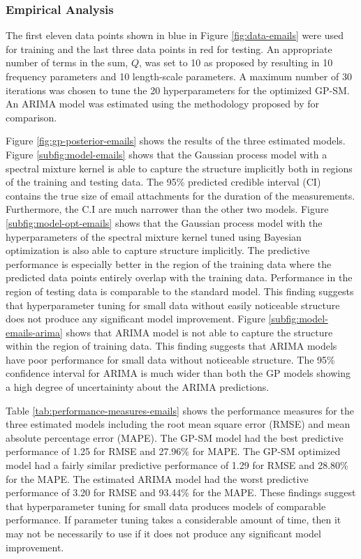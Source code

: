 \documentclass[letterpaper]{article}
\begin{document}
\subsubsection{Empirical Analysis}
The first eleven data points shown in blue in Figure \ref{fig:data-emails} were used for training and the last three data points in red for testing. An appropriate number of terms in the sum, $Q$, was set to 10 as proposed by \cite{wilson2015human} resulting in 10 frequency parameters and 10 length-scale parameters. A maximum number of 30 iterations was chosen to tune the 20 hyperparameters for the optimized GP-SM. An ARIMA model was estimated using the methodology proposed by \cite{veeramisti2016business} for comparison.

Figure \ref{fig:gp-posterior-emails} shows the results of the three estimated models. Figure \ref{subfig:model-emails} shows that the Gaussian process model with a spectral mixture kernel is able to capture the structure implicitly both in regions of the training and testing data. The 95\% predicted credible interval (CI) contains the true size of email attachments for the duration of the measurements. Furthermore, the C.I are much narrower than the other two models. Figure \ref{subfig:model-opt-emails} shows that the Gaussian process model with the hyperparameters of the spectral mixture kernel tuned using Bayesian optimization is also able to capture structure implicitly. The predictive performance is especially better in the region of the training data where the predicted data points entirely overlap with the training data. Performance in the region of testing data is comparable to the standard model. This finding suggests that hyperparameter tuning for small data without easily noticeable structure does not produce any significant model improvement. Figure \ref{subfig:model-emails-arima} shows that ARIMA model is not able to capture the structure within the region of training data. This finding suggests that ARIMA models have poor performance for small data without noticeable structure. The 95\% confidence interval for ARIMA is much wider than both the GP models showing a high degree of uncertaininty about the ARIMA predictions.

Table \ref{tab:performance-measures-emails} shows the performance measures for the three estimated models including the root mean square error (RMSE) and mean absolute percentage error (MAPE). The GP-SM model had the best predictive performance of 1.25 for RMSE and 27.96\% for MAPE. The GP-SM optimized model had a fairly similar predictive performance of 1.29 for RMSE and 28.80\% for the MAPE. The estimated ARIMA model had the worst predictive performance of 3.20 for RMSE and 93.44\% for the MAPE. These findings suggest that hyperparameter tuning for small data produces models of comparable performance. If parameter tuning takes a considerable amount of time, then it may not be necessarily to use if it does not produce any significant model improvement.
\end{document}
